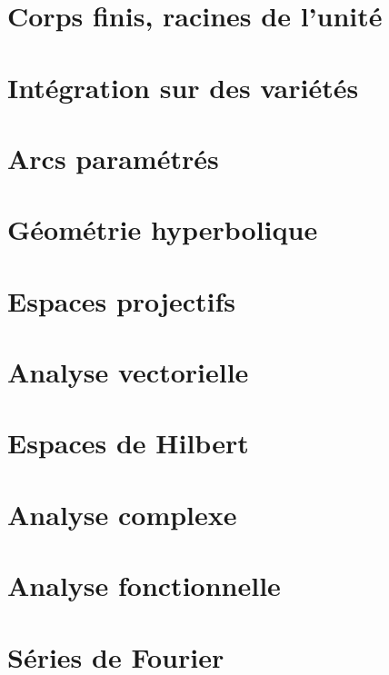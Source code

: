 \documentclass[a4paper,twoside,11pt]{book}
\begin{document}
\chapter{Corps finis, racines de l'unité}


\chapter{Intégration sur des variétés}







\chapter{Arcs paramétrés}




\chapter{Géométrie hyperbolique}


\chapter{Espaces projectifs}




\chapter{Analyse vectorielle}


\chapter{Espaces de Hilbert}


\chapter{Analyse complexe}          \label{ChapICHIooXbLccl}



\chapter{Analyse fonctionnelle}



\chapter{Séries de Fourier}

\end{document}
